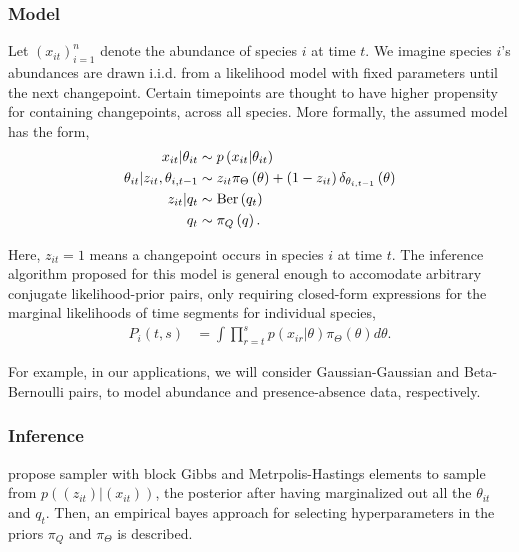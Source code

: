 \documentclass[14pt]{extarticle}
\begin{document}
\subsubsection{Model}
\label{subsec:basic_model}

Let $\left(x_{it}\right)_{i = 1}^{n}$ denote the abundance of species $i$ at
time $t$. We imagine species $i$'s abundances are drawn i.i.d. from a likelihood
model with fixed parameters until the next changepoint. Certain timepoints are
thought to have higher propensity for containing changepoints, across all
species. More formally, the assumed model has the form,
\begin{align*}
  x_{it} \vert \theta_{it} &\sim p\left(x_{it} \vert \theta_{it}\right) \\
  \theta_{it} \vert z_{it}, \theta_{i,t - 1} &\sim z_{it}\pi_{\Theta}\left(\theta\right) + \left(1 - z_{it}\right) \delta_{\theta_{i, t - 1}}\left(\theta\right) \\
  z_{it} \vert q_{t} &\sim \textnormal{Ber}\left(q_{t}\right) \\
  q_t &\sim \pi_{Q}\left(q\right).
\end{align*}

Here, $z_{it} = 1$ means a changepoint occurs in species $i$ at time $t$. The
inference algorithm proposed for this model is general enough to accomodate
arbitrary conjugate likelihood-prior pairs, only requiring closed-form
expressions for the marginal likelihoods of time segments for individual
species,
\begin{align*}
  P_i\left(t, s\right) &= \int \prod_{r = t}^{s} p\left(x_{ir} \vert \theta\right) \pi_{\Theta}\left(\theta\right) d\theta.
\end{align*}

For example, in our applications, we will consider Gaussian-Gaussian and
Beta-Bernoulli pairs, to model abundance and presence-absence data,
respectively.

\subsubsection{Inference}
\label{subsubsec:basic_inference}

\cite{fan2015empirical} propose sampler with block Gibbs and Metrpolis-Hastings
elements to sample from $p\left(\left(z_{it}\right) \vert
\left(x_{it}\right)\right)$, the posterior after having marginalized out all the
$\theta_{it}$ and $q_t$. Then, an empirical bayes approach for selecting
hyperparameters in the priors $\pi_{Q}$ and $\pi_{\Theta}$ is described.
\end{document}
